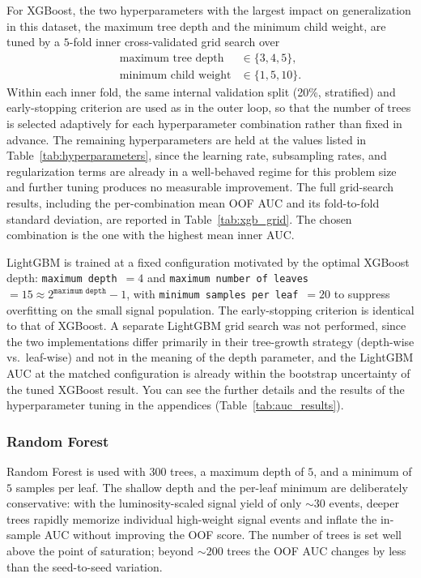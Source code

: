 \documentclass[conference]{IEEEtran}
\begin{document}
{For XGBoost, the two hyperparameters with the largest impact on
generalization in this dataset, the maximum tree depth and the
minimum child weight, are tuned by a $5$-fold inner
cross-validated grid search over
\[
\begin{aligned}
\text{maximum tree depth} &\in \{3,4,5\}, \\
\text{minimum child weight} &\in \{1,5,10\}.
\end{aligned}
\]
Within each inner fold, the same internal validation split
(20\%, stratified) and early-stopping criterion are used as in
the outer loop, so that the number of trees is selected
adaptively for each hyperparameter combination rather than fixed
in advance. The remaining hyperparameters are held at the values
listed in Table~\ref{tab:hyperparameters}, since the learning
rate, subsampling rates, and regularization terms are already
in a well-behaved regime for this problem size and further
tuning produces no measurable improvement. The full grid-search
results, including the per-combination mean OOF AUC and its
fold-to-fold standard deviation, are reported in
Table~\ref{tab:xgb_grid}. The chosen combination is the one
with the highest mean inner AUC.
 
 
LightGBM is trained at a fixed configuration motivated by the
optimal XGBoost depth: \texttt{maximum depth}~$=4$ and
\texttt{maximum number of leaves}~$=15\approx 2^{\texttt{maximum depth}}-1$, with
\texttt{minimum samples per leaf}~$=20$ to suppress overfitting on
the small signal population. The early-stopping criterion is
identical to that of XGBoost. A separate LightGBM grid search
was not performed, since the two implementations differ
primarily in their tree-growth strategy (depth-wise vs.\
leaf-wise) and not in the meaning of the depth parameter, and
the LightGBM AUC at the matched configuration is already
within the bootstrap uncertainty of the tuned XGBoost result. You can see the further details and the results of the hyperparameter tuning in the appendices (Table~\ref{tab:auc_results}).
 
\subsubsection{Random Forest}
 
Random Forest is used with $300$ trees, a maximum depth of $5$,
and a minimum of $5$ samples per leaf. The shallow depth and
the per-leaf minimum are deliberately conservative: with the
luminosity-scaled signal yield of only $\sim 30$ events, deeper
trees rapidly memorize individual high-weight signal events and
inflate the in-sample AUC without improving the OOF score. The
number of trees is set well above the point of saturation;
beyond $\sim 200$ trees the OOF AUC changes by less than the
seed-to-seed variation.
 
}
\end{document}
